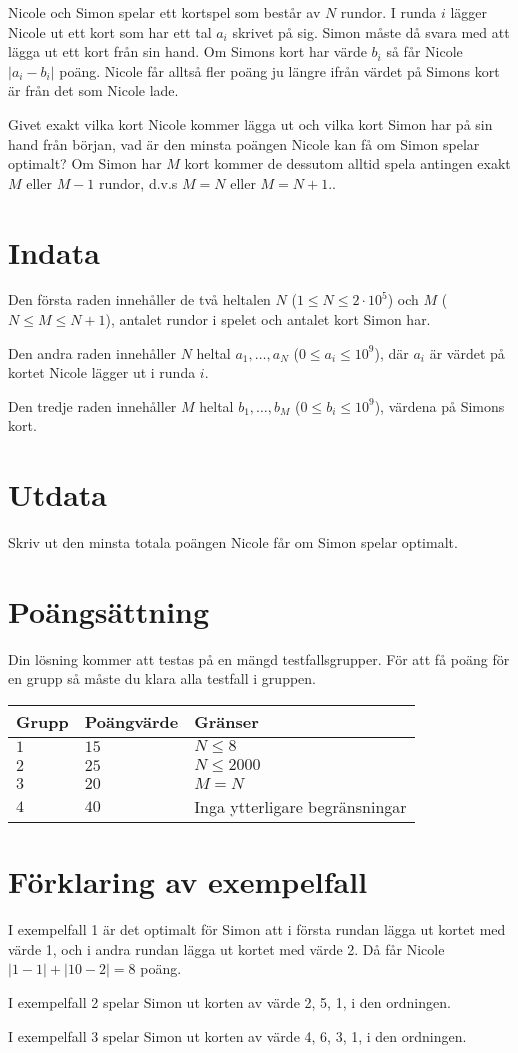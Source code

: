Nicole och Simon spelar ett kortspel som består av $N$ rundor.
I runda $i$ lägger Nicole ut ett kort som har ett tal $a_i$ skrivet på sig.
Simon måste då svara med att lägga ut ett kort från sin hand.
Om Simons kort har värde $b_i$ så får Nicole $|a_i-b_i|$ poäng.
Nicole får alltså fler poäng ju längre ifrån värdet på Simons kort är från det som Nicole lade.

Givet exakt vilka kort Nicole kommer lägga ut och vilka kort Simon har på sin hand från början, vad är den minsta poängen Nicole kan få om Simon spelar optimalt?
Om Simon har $M$ kort kommer de dessutom alltid spela antingen exakt $M$ eller $M - 1$ rundor, d.v.s $M = N$ eller $M = N + 1$..

\section*{Indata}
Den första raden innehåller de två heltalen $N$ ($1\leq N \leq 2 \cdot 10^5$) och $M$ ($N\leq M \leq N+1$), antalet rundor i spelet och antalet kort Simon har.

Den andra raden innehåller $N$ heltal $a_1, \dots, a_N$ ($0\le a_i \le 10^9$), där $a_i$ är värdet på kortet Nicole lägger ut i runda $i$.

Den tredje raden innehåller $M$ heltal $b_1, \dots, b_M$ ($0\le b_i \le 10^9$), värdena på Simons kort.

\section*{Utdata}
Skriv ut den minsta totala poängen Nicole får om Simon spelar optimalt.

\section*{Poängsättning}
Din lösning kommer att testas på en mängd testfallsgrupper.
För att få poäng för en grupp så måste du klara alla testfall i gruppen.

\noindent
\begin{tabular}{| l | l | p{12cm} |}
  \hline
  Grupp & Poängvärde & Gränser \\ \hline
  $1$   & $15$       & $N \leq 8 $\\ \hline
  $2$   & $25$       & $N \leq 2000 $  \\ \hline
  $3$   & $20$       & $M=N$ \\ \hline
  $4$   & $40$       & Inga ytterligare begränsningar \\ \hline
\end{tabular}

\section*{Förklaring av exempelfall}
I exempelfall 1 är det optimalt för Simon att i första rundan lägga ut kortet med värde 1, och i andra rundan lägga ut kortet med värde 2. Då får Nicole $|1-1| + |10-2|=8$ poäng.

I exempelfall 2 spelar Simon ut korten av värde 2, 5, 1, i den ordningen.

I exempelfall 3 spelar Simon ut korten av värde 4, 6, 3, 1, i den ordningen.
